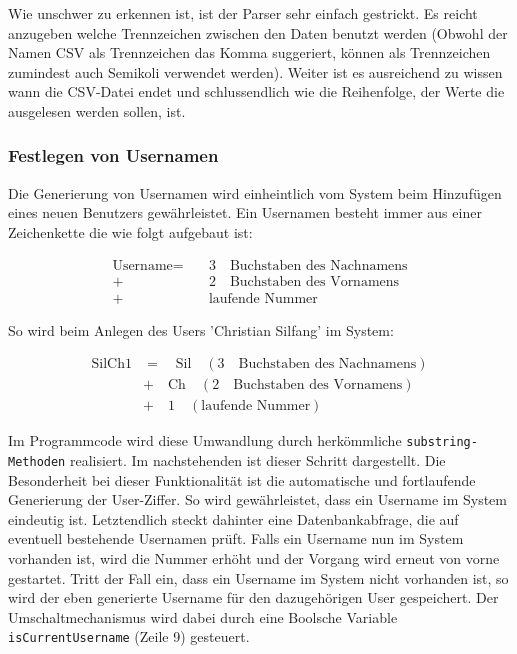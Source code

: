 Wie unschwer zu erkennen ist, ist der Parser sehr einfach gestrickt. Es reicht anzugeben welche Trennzeichen zwischen den Daten benutzt werden (Obwohl der Namen CSV als Trennzeichen das Komma suggeriert, können als Trennzeichen zumindest auch Semikoli verwendet werden).
Weiter ist es ausreichend zu wissen wann die CSV-Datei endet und schlussendlich wie die Reihenfolge, der Werte die ausgelesen werden sollen, ist.

	

\subsubsection{Festlegen von Usernamen}

Die Generierung von Usernamen wird einheintlich vom System beim Hinzufügen eines neuen Benutzers gewährleistet.
Ein Usernamen besteht immer aus einer Zeichenkette die wie folgt aufgebaut ist:

\[
\begin{split}
  \text{Username} =\quad & 3\quad \text{Buchstaben des Nachnamens}\\ 
  +\quad & 2 \quad \text{Buchstaben des Vornamens}\\ 
  +\quad & \text{laufende Nummer}
\end{split}
\]

So wird beim Anlegen des Users 'Christian Silfang' im System:

\[
\begin{split}
  \text{SilCh1} &= \quad \text{Sil} \quad (3 \quad \text{Buchstaben des Nachnamens})\\ 
		&+ \quad \text{Ch} \quad (2 \quad \text{Buchstaben des Vornamens})\\ 
		&+ \quad 1 \quad (\text{laufende Nummer})
\end{split}
\]

Im Programmcode wird diese Umwandlung durch herkömmliche \texttt{substring-Methoden} realisiert.
Im nachstehenden  ist dieser Schritt dargestellt. Die Besonderheit bei dieser Funktionalität ist die automatische und fortlaufende Generierung der User-Ziffer. So wird gewährleistet, dass ein Username im System eindeutig ist. Letztendlich steckt dahinter eine Datenbankabfrage, die auf eventuell bestehende Usernamen prüft.
Falls ein Username nun im System vorhanden ist, wird die Nummer erhöht und der Vorgang wird erneut von vorne gestartet. Tritt der Fall ein, dass ein Username im System nicht vorhanden ist, so wird der eben generierte Username für den dazugehörigen User gespeichert. Der Umschaltmechanismus wird dabei durch eine Boolsche Variable \texttt{isCurrentUsername} (Zeile 9) gesteuert.

